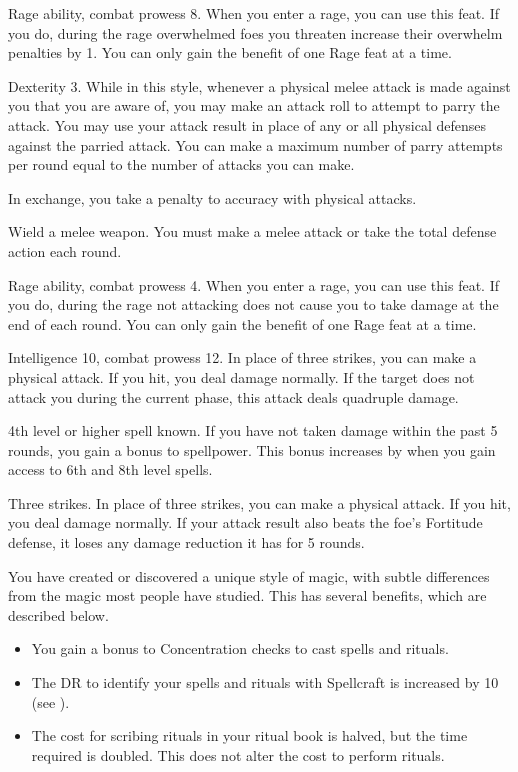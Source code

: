 \featpres Rage ability, combat prowess 8.
\featben When you enter a rage, you can use this feat. If you do, during the rage overwhelmed foes you threaten increase their overwhelm penalties by 1.
 You can only gain the benefit of one Rage feat at a time.

\featpre Dexterity 3.
\featben While in this style, whenever a physical melee attack is made against you that you are aware of, you may make an attack roll to attempt to parry the attack.
You may use your attack result in place of any or all physical defenses against the parried attack.
You can make a maximum number of parry attempts per round equal to the number of attacks you can make.

In exchange, you take a  penalty to accuracy with physical attacks.

\stylereq Wield a melee weapon.
You must make a melee attack or take the total defense action each round.

\featpres Rage ability, combat prowess 4.
\featben When you enter a rage, you can use this feat. If you do, during the rage not attacking does not cause you to take damage at the end of each round.
 You can only gain the benefit of one Rage feat at a time.

\featpres Intelligence 10, combat prowess 12.
\featben In place of three strikes, you can make a physical attack.
If you hit, you deal damage normally.
If the target does not attack you during the current phase, this attack deals quadruple damage.

\featpre 4th level or higher  spell known.
\featben If you have not taken damage within the past 5 rounds, you gain a  bonus to spellpower.
This bonus increases by  when you gain access to 6th and 8th level spells.

\featpre Three strikes.
\featben In place of three strikes, you can make a physical attack.
If you hit, you deal damage normally.
If your attack result also beats the foe's Fortitude defense, it loses any damage reduction it has for 5 rounds.

\featben You have created or discovered a unique style of magic, with subtle differences from the magic most people have studied.
This has several benefits, which are described below.
\begin{itemize}
    \item You gain a  bonus to Concentration checks to cast spells and rituals.
    \item The DR to identify your spells and rituals with Spellcraft is increased by 10 (see ).
    \item The cost for scribing rituals in your ritual book is halved, but the time required is doubled.
        This does not alter the cost to perform rituals.
\end{itemize}

